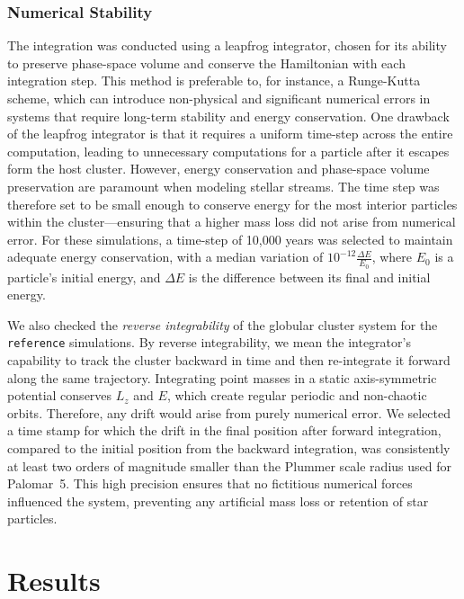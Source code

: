 \documentclass{aa}
\begin{document}
  \subsubsection*{Numerical Stability}

    The integration was conducted using a leapfrog integrator, chosen for its ability to preserve phase-space volume and conserve the Hamiltonian with each integration step. This method is preferable to, for instance, a Runge-Kutta scheme, which can introduce non-physical and significant numerical errors in systems that require long-term stability and energy conservation. One drawback of the leapfrog integrator is that it requires a uniform time-step across the entire computation, leading to unnecessary computations for a particle after it escapes form the host cluster. However, energy conservation and phase-space volume preservation are paramount when modeling stellar streams. The time step was therefore set to be small enough to conserve energy for the most interior particles within the cluster---ensuring that a higher mass loss did not arise from numerical error. For these simulations, a time-step of 10,000 years was selected to maintain adequate energy conservation, with a median variation of $10^{-12} \frac{\Delta E}{E_0}$, where $E_0$ is a particle's initial energy, and $\Delta E$ is the difference between its final and initial energy. 
    
    We also checked the \textit{reverse integrability} of the globular cluster system for the \texttt{reference} simulations. By reverse integrability, we mean the integrator's capability to track the cluster backward in time and then re-integrate it forward along the same trajectory. Integrating point masses in a static axis-symmetric potential conserves $L_z$ and $E$, which create regular periodic and non-chaotic orbits. Therefore, any drift would arise from purely numerical error. We selected a time stamp for which the drift in the final position after forward integration, compared to the initial position from the backward integration, was consistently at least two orders of magnitude smaller than the Plummer scale radius used for Palomar~5. This high precision ensures that no fictitious numerical forces influenced the system, preventing any artificial mass loss or retention of star particles.

\section{Results}
\end{document}
